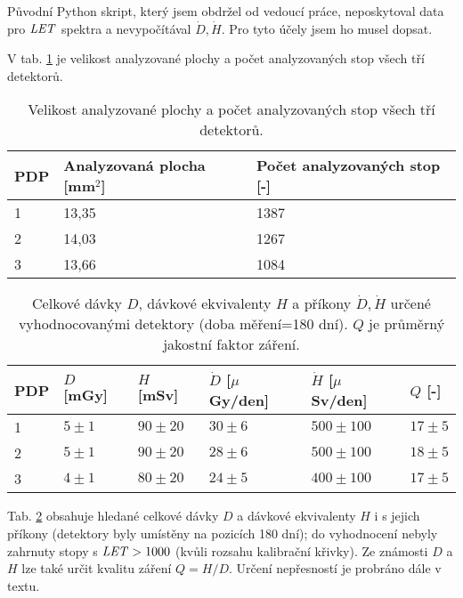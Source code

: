 
Původní Python skript, který jsem obdržel od vedoucí práce, neposkytoval data pro $\mathit{LET}$ spektra a nevypočítával $\dot{D},\dot{H}$. Pro tyto účely jsem ho musel dopsat. 
 
V tab. \ref{tab:praktickaCast_analyzovanaPlocha} je velikost analyzované plochy a počet analyzovaných stop všech tří detektorů.
\begin{table}[H]
  \centering
  \caption{Velikost analyzované plochy a počet analyzovaných stop všech tří detektorů.}
  \label{tab:praktickaCast_analyzovanaPlocha}
  \begin{tabular}{lll}
	\toprule
	PDP&Analyzovaná plocha [mm$^2$]& Počet analyzovaných stop [-]\\
	\midrule
	1&13,35&1387\\
	2&14,03&1267\\
	3&13,66&1084\\
	\bottomrule
  \end{tabular}
\end{table}
\begin{table}[h]
  \centering
  \caption{Celkové dávky $D$, dávkové ekvivalenty $H$ a příkony $\dot{D},\dot{H}$ určené vyhodnocovanými detektory (doba měření=180 dní). $Q$ je průměrný jakostní faktor záření.}
  \label{tab:praktickaCast_davkyVysledky}
  \begin{tabular}{llllll}
	\toprule
	PDP&$D$ [mGy]&$H$ [mSv]&$\dot{D}$ [$\mu$Gy/den]&$\dot{H}$ [$\mu$Sv/den]& $Q$ [-]\\
	\midrule
	1&$5\pm1$&$90\pm20$&$30\pm6$&$500\pm100$&$17\pm5$\\
	2&$5\pm1$&$90\pm20$&$28\pm6$&$500\pm100$&$18\pm5$\\
	3&$4\pm1$&$80\pm20$&$24\pm5$&$400\pm100$&$17\pm5$\\
	\bottomrule
  \end{tabular}
\end{table}

Tab. \ref{tab:praktickaCast_davkyVysledky} obsahuje hledané celkové dávky $D$ a dávkové ekvivalenty $H$ i s jejich příkony (detektory byly umístěny na pozicích 180 dní); do vyhodnocení nebyly zahrnuty stopy s $\mathit{LET}>1000$ (kvůli rozsahu kalibrační křivky). Ze známosti $D$ a $H$ lze také určit kvalitu záření $Q=H/D$. Určení nepřesností je probráno dále v textu.

